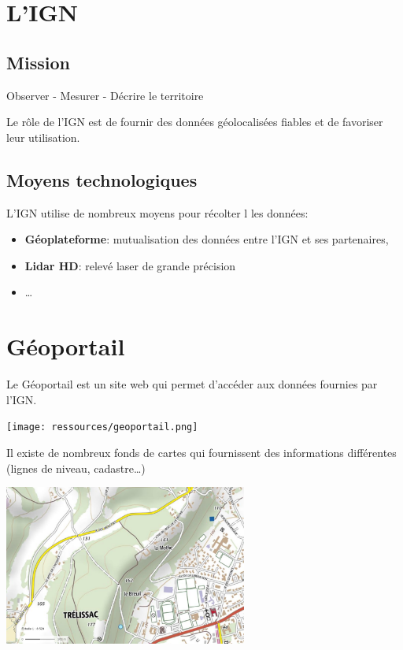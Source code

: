 \documentclass[a4paper,11pt]{article}
\begin{document}
\begin{center}
\end{center}
\section{L'IGN}
\subsection{Mission}
\begin{center}
    {\Large Observer - Mesurer - Décrire le territoire}
\end{center}
Le rôle de l'IGN est de fournir des données géolocalisées fiables et de favoriser leur utilisation.
\subsection{Moyens technologiques}
L'IGN utilise de nombreux moyens pour récolter l
les données:
\begin{itemize}
    \item \textbf{Géoplateforme}: mutualisation des données entre l'IGN et ses partenaires,
    \item \textbf{Lidar HD}: relevé laser de grande précision
    \item \dots
\end{itemize}
\section{Géoportail}
Le Géoportail est un site web qui permet d'accéder aux données fournies par l'IGN.
\begin{center}
\centering
\texttt{[image: ressources/geoportail.png]}
\end{center}
Il existe de nombreux fonds de cartes qui fournissent des informations différentes (lignes de niveau, cadastre\dots)
\begin{center}
\centering
\includegraphics[width=8cm]{ressources/mission-ign.png}
\end{center}
\end{document}
